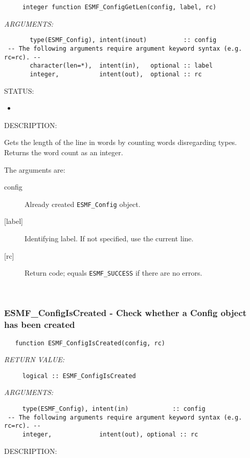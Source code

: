   
\begin{verbatim}     integer function ESMF_ConfigGetLen(config, label, rc)
 \end{verbatim}{\em ARGUMENTS:}
\begin{verbatim}       type(ESMF_Config), intent(inout)          :: config 
 -- The following arguments require argument keyword syntax (e.g. rc=rc). --
       character(len=*),  intent(in),   optional :: label
       integer,           intent(out),  optional :: rc         \end{verbatim}
{\sf STATUS:}
   \begin{itemize}
   \item{}
   \end{itemize}
  
{\sf DESCRIPTION:\\ }

 
   Gets the length of the line in words by counting words
   disregarding types.  Returns the word count as an integer.
  
     The arguments are:
     \begin{description}
     \item [config]
       Already created {\tt ESMF\_Config} object.
     \item [{[label]}]
       Identifying label.   If not specified, use the current line.
     \item [{[rc]}]
       Return code; equals {\tt ESMF\_SUCCESS} if there are no errors.
     \end{description}
   
 
\mbox{}\hrulefill\ 
 
\subsubsection [ESMF\_ConfigIsCreated] {ESMF\_ConfigIsCreated - Check whether a Config object has been created}


 
\begin{verbatim}   function ESMF_ConfigIsCreated(config, rc)\end{verbatim}{\em RETURN VALUE:}
\begin{verbatim}     logical :: ESMF_ConfigIsCreated\end{verbatim}{\em ARGUMENTS:}
\begin{verbatim}     type(ESMF_Config), intent(in)            :: config
 -- The following arguments require argument keyword syntax (e.g. rc=rc). --
     integer,             intent(out), optional :: rc
 \end{verbatim}
{\sf DESCRIPTION:\\ }


